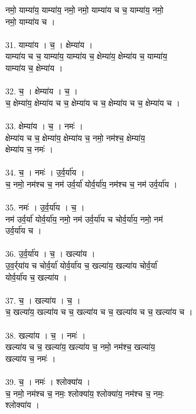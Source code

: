 नमो॒ याम्या॑य॒ याम्या॑य॒ नमो॒ नमो॒ याम्या॑य च च॒ याम्या॑य॒ नमो॒\\
नमो॒ याम्या॑य च ।\\
\\
31. याम्या॑य । च॒ । क्षेम्या॑य ।\\
याम्या॑य च च॒ याम्या॑य॒ याम्या॑य च॒ क्षेम्या॑य॒ क्षेम्या॑य च॒ याम्या॑य॒\\
याम्या॑य च॒ क्षेम्या॑य ।\\
\\
32. च॒ । क्षेम्या॑य । च॒ ।\\
च॒ क्षेम्या॑य॒ क्षेम्या॑य च च॒ क्षेम्या॑य च च॒ क्षेम्या॑य च च॒ क्षेम्या॑य च ।\\
\\
33. क्षेम्या॑य । च॒ । नमः॑ ।\\
क्षेम्या॑य च च॒ क्षेम्या॑य॒ क्षेम्या॑य च॒ नमो॒ नम॑श्च॒ क्षेम्या॑य॒\\
क्षेम्या॑य च॒ नमः॑ ।\\
\\
34. च॒ । नमः॑ । उ॒र्व॒र्या॑य ।\\
च॒ नमो॒ नम॑श्च च॒ नम॑ उर्व॒र्या॑ योर्व॒र्या॑य॒ नम॑श्च च॒ नम॑ उर्व॒र्या॑य ।\\
\\
35. नमः॑ । उ॒र्व॒र्या॑य । च॒ ।\\
नम॑ उर्व॒र्या॑ योर्व॒र्या॑य॒ नमो॒ नम॑ उर्व॒र्या॑य च चोर्व॒र्या॑य॒ नमो॒ नम॑\\
उर्व॒र्या॑य च ।\\
\\
36. उ॒र्व॒र्या॑य । च॒ । खल्या॑य ।\\
उ॒व॒र्र्या॑य च चोर्व॒र्या॑ योर्व॒र्या॑य च॒ खल्या॑य॒ खल्या॑य चोर्व॒र्या॑\\
योर्व॒र्या॑य च॒ खल्या॑य ।\\
\\
37. च॒ । खल्या॑य । च॒ ।\\
च॒ खल्या॑य॒ खल्या॑य च च॒ खल्या॑य च च॒ खल्या॑य च च॒ खल्या॑य च ।\\
\\
38. खल्या॑य । च॒ । नमः॑ ।\\
खल्या॑य च च॒ खल्या॑य॒ खल्या॑य च॒ नमो॒ नम॑श्च॒ खल्या॑य॒\\
खल्या॑य च॒ नमः॑ ।\\
\\
39. च॒ । नमः॑ । श्लोक्या॑य ।\\
च॒ नमो॒ नम॑श्च च॒ नमः॒ श्लोक्या॑य॒ श्लोक्या॑य॒ नम॑श्च च॒ नमः॒\\
श्लोक्या॑य ।\\
\\

